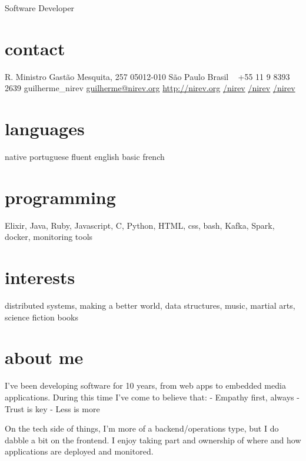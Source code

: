 \documentclass{nirev-cv}
\begin{document}
       {Software Developer}


\begin{aside}
  \section{contact}
    R. Ministro Gastão Mesquita, 257
    05012-010 São Paulo
    Brasil
    ~
    +55 11 9 8393 2639
    {\faSkype } guilherme\_nirev
    \href{mailto:guilherme@nirev.org}{guilherme@nirev.org}
    \href{http://nirev.org}{http://nirev.org}
    \href{https://github.com/nirev}{\faGithub /nirev}
    \href{https://twitter.com/nirev}{\faTwitter /nirev}
    \href{https://linkedin.com/in/nirev}{\faLinkedin /nirev}
  \section{languages}
    native portuguese
    fluent english
    basic french
  \section{programming}
    Elixir, Java, Ruby, Javascript, C, Python,
    HTML, css, bash,
    Kafka, Spark, docker, 
    monitoring tools
  \section{interests}
distributed systems, making a better world, data structures, music, martial arts, science fiction books
\end{aside}

\section{about me}

I've been developing software for 10 years, from web apps to embedded media applications.
During this time I've come to believe that:
- Empathy first, always
- Trust is key
- Less is more

On the tech side of things, I'm more of a backend/operations type, but I do dabble a bit on the frontend.
I enjoy taking part and ownership of where and how applications are deployed and monitored.
\end{document}
